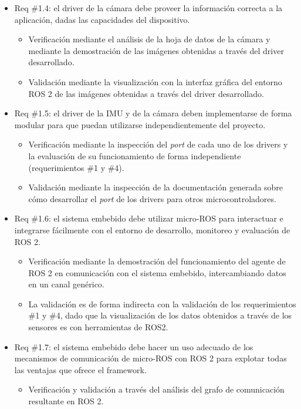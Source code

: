 \documentclass[
11pt, %
codirector, %
]{charter}
\begin{document}
\begin{itemize}
\begin{itemize}
	\end{itemize}
	\item Req \#1.4: el driver de la cámara debe proveer la información correcta a la aplicación, dadas las capacidades del dispositivo.
	\begin{itemize}
		\item Verificación mediante el análisis de la hoja de datos de la cámara y mediante la demostración de las imágenes obtenidas a través del driver desarrollado.
		\item Validación mediante la visualización con la interfaz gráfica del entorno ROS 2 de las imágenes obtenidas a través del driver desarrollado.
	\end{itemize}
	\item Req \#1.5: el driver de la IMU y de la cámara deben implementarse de forma modular para que puedan utilizarse independientemente del proyecto.
	\begin{itemize}
		\item Verificación mediante la inspección del \textit{port} de cada uno de los drivers y la evaluación de su funcionamiento de forma independiente (requerimientos \#1 y \#4).
		\item Validación mediante la inspección de la documentación generada sobre cómo desarrollar el \textit{port} de los drivers para otros microcontroladores.
	\end{itemize}
	\item Req \#1.6: el sistema embebido debe utilizar micro-ROS para interactuar e integrarse fácilmente con el entorno de desarrollo, monitoreo y evaluación de ROS 2.
	\begin{itemize}
		\item Verificación mediante la demostración del funcionamiento del agente de ROS 2 en comunicación con el sistema embebido, intercambiando datos en un canal genérico.
		\item La validación es de forma indirecta con la validación de los requerimientos \#1 y \#4, dado que la visualización de los datos obtenidos a través de los sensores es con herramientas de ROS2.
	\end{itemize}
	\item Req \#1.7: el sistema embebido debe hacer un uso adecuado de los mecanismos de comunicación de micro-ROS con ROS 2 para explotar todas las ventajas que ofrece el framework.
	\begin{itemize}
		\item Verificación y validación a través del análisis del grafo de comunicación resultante en ROS 2. 

\end{itemize}
\end{itemize}
\end{document}
